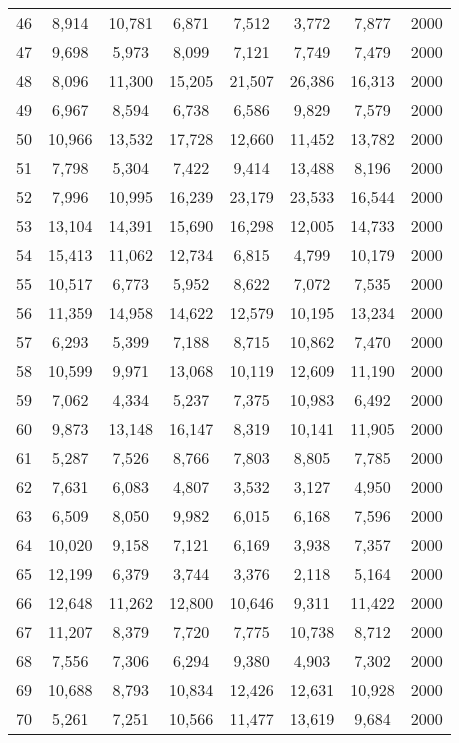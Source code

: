 \begin{longtable}{cccccccc}
46  & 8,914  & 10,781 & 6,871  & 7,512  & 3,772  & 7,877  & 2000 \\
47  & 9,698  & 5,973  & 8,099  & 7,121  & 7,749  & 7,479  & 2000 \\
48  & 8,096  & 11,300 & 15,205 & 21,507 & 26,386 & 16,313 & 2000 \\
49  & 6,967  & 8,594  & 6,738  & 6,586  & 9,829  & 7,579  & 2000 \\
50  & 10,966 & 13,532 & 17,728 & 12,660 & 11,452 & 13,782 & 2000 \\
51  & 7,798  & 5,304  & 7,422  & 9,414  & 13,488 & 8,196  & 2000 \\
52  & 7,996  & 10,995 & 16,239 & 23,179 & 23,533 & 16,544 & 2000 \\
53  & 13,104 & 14,391 & 15,690 & 16,298 & 12,005 & 14,733 & 2000 \\
54  & 15,413 & 11,062 & 12,734 & 6,815  & 4,799  & 10,179 & 2000 \\
55  & 10,517 & 6,773  & 5,952  & 8,622  & 7,072  & 7,535  & 2000 \\
56  & 11,359 & 14,958 & 14,622 & 12,579 & 10,195 & 13,234 & 2000 \\
57  & 6,293  & 5,399  & 7,188  & 8,715  & 10,862 & 7,470  & 2000 \\
58  & 10,599 & 9,971  & 13,068 & 10,119 & 12,609 & 11,190 & 2000 \\
59  & 7,062  & 4,334  & 5,237  & 7,375  & 10,983 & 6,492  & 2000 \\
60  & 9,873  & 13,148 & 16,147 & 8,319  & 10,141 & 11,905 & 2000 \\
61  & 5,287  & 7,526  & 8,766  & 7,803  & 8,805  & 7,785  & 2000 \\
62  & 7,631  & 6,083  & 4,807  & 3,532  & 3,127  & 4,950  & 2000 \\
63  & 6,509  & 8,050  & 9,982  & 6,015  & 6,168  & 7,596  & 2000 \\
64  & 10,020 & 9,158  & 7,121  & 6,169  & 3,938  & 7,357  & 2000 \\
65  & 12,199 & 6,379  & 3,744  & 3,376  & 2,118  & 5,164  & 2000 \\
66  & 12,648 & 11,262 & 12,800 & 10,646 & 9,311  & 11,422 & 2000 \\
67  & 11,207 & 8,379  & 7,720  & 7,775  & 10,738 & 8,712  & 2000 \\
68  & 7,556  & 7,306  & 6,294  & 9,380  & 4,903  & 7,302  & 2000 \\
69  & 10,688 & 8,793  & 10,834 & 12,426 & 12,631 & 10,928 & 2000 \\
70  & 5,261  & 7,251  & 10,566 & 11,477 & 13,619 & 9,684  & 2000 \\

\end{longtable}
